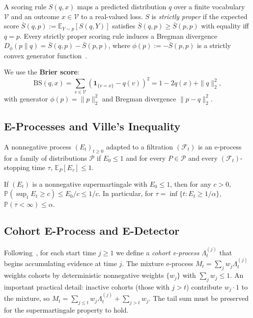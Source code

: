 \documentclass[runningheads]{llncs}
\begin{document}
A scoring rule $S(q, x)$ maps a predicted distribution $q$ over a finite
vocabulary $\mathcal{V}$ and an outcome $x \in \mathcal{V}$ to a real-valued
loss. $S$ is \textit{strictly proper} if the expected score
$\bar{S}(q, p) := \mathbb{E}_{Y \sim p}[S(q, Y)]$ satisfies
$\bar{S}(q, p) \ge \bar{S}(p, p)$ with equality iff $q = p$. Every strictly
proper scoring rule induces a Bregman divergence
$D_\phi(p \| q) = \bar{S}(q, p) - \bar{S}(p, p)$, where
$\phi(p) := -\bar{S}(p, p)$ is a strictly convex generator
function~\cite{gneiting2007strictly}.

We use the \textbf{Brier score}:
\begin{equation}
\text{BS}(q, x) = \sum_{v \in \mathcal{V}} (\mathbf{1}_{\{v=x\}} - q(v))^2
                = 1 - 2q(x) + \|q\|_2^2,
\end{equation}
with generator $\phi(p) = \|p\|_2^2$ and Bregman divergence $\|p - q\|_2^2$.

\subsection{E-Processes and Ville's Inequality}

\begin{definition}
A nonnegative process $(E_t)_{t \ge 0}$ adapted to a filtration
$(\mathcal{F}_t)$ is an e-process for a family of distributions $\mathcal{P}$
if $E_0 \le 1$ and for every $P \in \mathcal{P}$ and every
$(\mathcal{F}_t)$-stopping time $\tau$,
$\mathbb{E}_P[E_\tau] \le 1$.
\end{definition}

\begin{theorem}
If $(E_t)$ is a nonnegative supermartingale with $E_0 \le 1$, then for any
$c > 0$, $\mathbb{P}(\sup_t E_t \ge c) \le E_0 / c \le 1/c$. In particular,
for $\tau = \inf\{t: E_t \ge 1/\alpha\}$,
$\mathbb{P}(\tau < \infty) \le \alpha$.
\end{theorem}

\subsection{Cohort E-Process and E-Detector}

Following~\cite{shin2023edetectors}, for each start time $j \ge 1$ we define
a \textit{cohort e-process} $\Lambda_t^{(j)}$ that begins accumulating evidence
at time $j$. The mixture e-process
$M_t = \sum_{j} w_j \Lambda_t^{(j)}$ weights cohorts by deterministic
nonnegative weights $\{w_j\}$ with $\sum_j w_j \le 1$.
An important practical detail: inactive cohorts (those with $j > t$) contribute
$w_j \cdot 1$ to the mixture, so
$M_t = \sum_{j \le t} w_j \Lambda_t^{(j)} + \sum_{j > t} w_j$. The tail sum
must be preserved for the supermartingale property to hold.
\end{document}
